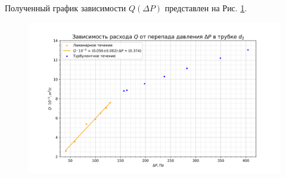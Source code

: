 \documentclass[a4paper, 12pt]{article}
\begin{document}
\newpage
\par Полученный график зависимости $Q(\Delta{P})$ представлен на Рис. \ref{ris8}.
\begin{figure}[h!]
\begin{flushleft}
    \includegraphics[scale=0.75]{1.3.3_2.png}
\end{flushleft}
\caption{}
\label{ris8}
\end{figure}
\end{document}
